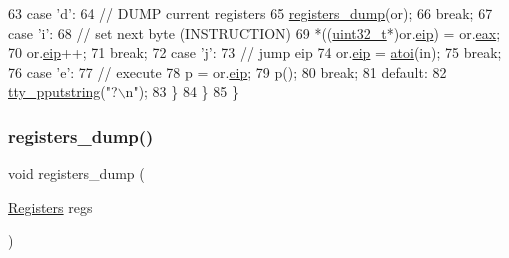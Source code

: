 \begin{DoxyCode}
63             \textcolor{keywordflow}{case} \textcolor{charliteral}{'d'}:
64                 \textcolor{comment}{// DUMP current registers}
65                 \hyperlink{a00173_ac4a1734d665cf10e32ddb9ebebfd8169_ac4a1734d665cf10e32ddb9ebebfd8169}{registers\_dump}(or);
66                 \textcolor{keywordflow}{break};
67             \textcolor{keywordflow}{case} \textcolor{charliteral}{'i'}:
68                 \textcolor{comment}{// set next byte (INSTRUCTION)}
69                 *((\hyperlink{a00140_a435d1572bf3f880d55459d9805097f62_a435d1572bf3f880d55459d9805097f62}{uint32\_t}*)or.\hyperlink{a00260_ad5110c091e713dabd23f23a62d026c07_ad5110c091e713dabd23f23a62d026c07}{eip}) = or.\hyperlink{a00260_aafc7189a84cb0f6ed3d37ee82bec09bc_aafc7189a84cb0f6ed3d37ee82bec09bc}{eax};
70                 or.\hyperlink{a00260_ad5110c091e713dabd23f23a62d026c07_ad5110c091e713dabd23f23a62d026c07}{eip}++;
71                 \textcolor{keywordflow}{break};
72             \textcolor{keywordflow}{case} \textcolor{charliteral}{'j'}:
73                 \textcolor{comment}{// jump eip}
74                 or.\hyperlink{a00260_ad5110c091e713dabd23f23a62d026c07_ad5110c091e713dabd23f23a62d026c07}{eip} = \hyperlink{a00125_a8456d79947fb428e0927d19e7a1e9423_a8456d79947fb428e0927d19e7a1e9423}{atoi}(in);
75                 \textcolor{keywordflow}{break};
76             \textcolor{keywordflow}{case} \textcolor{charliteral}{'e'}:
77                 \textcolor{comment}{// execute}
78                 p = or.\hyperlink{a00260_ad5110c091e713dabd23f23a62d026c07_ad5110c091e713dabd23f23a62d026c07}{eip};
79                 p();
80                 \textcolor{keywordflow}{break};
81             \textcolor{keywordflow}{default}:
82                 \hyperlink{a00179_ade960b1320324706aac6c00cc6b1b2fe_ade960b1320324706aac6c00cc6b1b2fe}{tty\_pputstring}(\textcolor{stringliteral}{"?\(\backslash\)n"});
83         \}
84     \}
85 \}
\end{DoxyCode}
\mbox{\label{a00173_ac4a1734d665cf10e32ddb9ebebfd8169_ac4a1734d665cf10e32ddb9ebebfd8169}} 
\subsubsection{\texorpdfstring{registers\+\_\+dump()}{registers\_dump()}}
{\footnotesize\ttfamily void registers\+\_\+dump (\begin{DoxyParamCaption}\item[{\hyperlink{a00260}{Registers}}]{regs }\end{DoxyParamCaption})}



